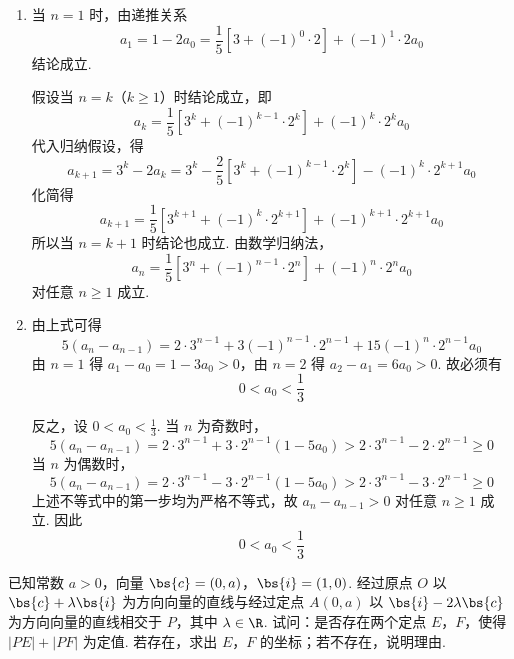 \begin{solution}
\begin{enumerate}
\item 当 \(n=1\) 时，由递推关系
\[
a_{1}=1-2a_{0}
=\frac{1}{5}\left[3+(-1)^{0}\cdot2\right]+(-1)^{1}\cdot2a_{0}
\]
结论成立.

假设当 \(n=k\)（\(k\geqslant1\)）时结论成立，即
\[
a_{k}=\frac{1}{5}\left[3^{k}+(-1)^{k-1}\cdot2^{k}\right]+(-1)^{k}\cdot2^{k}a_{0}
\]
代入归纳假设，得
\[
a_{k+1}=3^{k}-2a_{k}
=3^{k}-\frac{2}{5}\left[3^{k}+(-1)^{k-1}\cdot2^{k}\right]-(-1)^{k}\cdot2^{k+1}a_{0}
\]
化简得
\[
a_{k+1}=\frac{1}{5}\left[3^{k+1}+(-1)^{k}\cdot2^{k+1}\right]+(-1)^{k+1}\cdot2^{k+1}a_{0}
\]
所以当 \(n=k+1\) 时结论也成立. 由数学归纳法，
\[
a_n=\frac{1}{5}\left[3^{n}+(-1)^{n-1}\cdot2^{n}\right]+(-1)^{n}\cdot2^{n}a_{0}
\]
对任意 \(n\geqslant1\) 成立.

\item 由上式可得
\[
5(a_n-a_{n-1})=2\cdot3^{n-1}+3(-1)^{n-1}\cdot2^{n-1}+15(-1)^{n}\cdot2^{n-1}a_{0}
\]
由 \(n=1\) 得 \(a_{1}-a_{0}=1-3a_{0}>0\)，由 \(n=2\) 得 \(a_{2}-a_{1}=6a_{0}>0\).
故必须有
\[
0<a_{0}<\frac{1}{3}
\]

反之，设 \(0<a_{0}<\frac{1}{3}\). 当 \(n\) 为奇数时，
\[
5(a_n-a_{n-1})=2\cdot3^{n-1}+3\cdot2^{n-1}(1-5a_{0})
>2\cdot3^{n-1}-2\cdot2^{n-1}\geqslant0
\]
当 \(n\) 为偶数时，
\[
5(a_n-a_{n-1})=2\cdot3^{n-1}-3\cdot2^{n-1}(1-5a_{0})
>2\cdot3^{n-1}-3\cdot2^{n-1}\geqslant0
\]
上述不等式中的第一步均为严格不等式，故 \(a_n-a_{n-1}>0\) 对任意 \(n\geqslant1\) 成立. 因此
\[
\boxed{0<a_{0}<\frac{1}{3}}
\]
\end{enumerate}
\end{solution}

\begin{problem}
已知常数 \(a > 0\)，向量 \(\bs{c} = (0, a)\)，\(\bs{i} = (1, 0)\). 经过原点 \(O\) 以 \(\bs{c} + \lambda \bs{i}\) 为方向向量的直线与经过定点 \(A(0, a)\) 以 \(\bs{i} - 2\lambda \bs{c}\) 为方向向量的直线相交于 \(P\)，其中 \(\lambda \in \R\). 试问：是否存在两个定点 \(E\)，\(F\)，使得 \(|PE| + |PF|\) 为定值. 若存在，求出 \(E\)，\(F\) 的坐标；若不存在，说明理由.
\end{problem}


